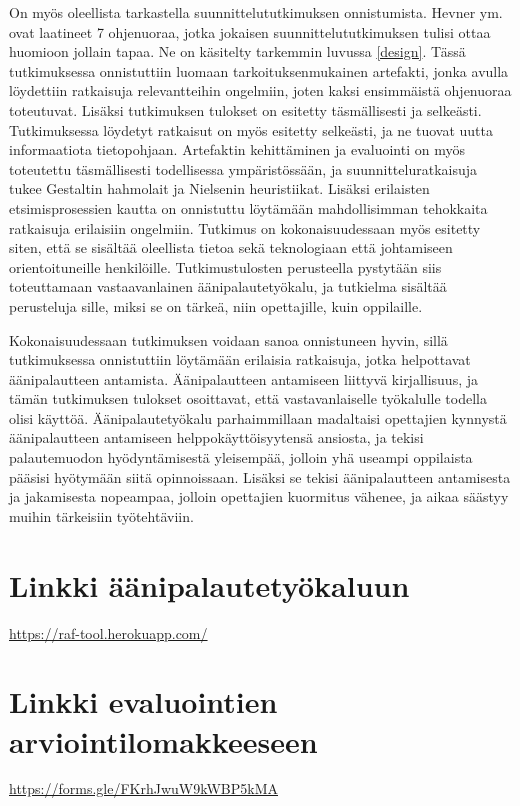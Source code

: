 \documentclass[utf8]{gradu3}
\begin{document}
On myös oleellista tarkastella suunnittelututkimuksen onnistumista. Hevner ym. \parencite*{hevner2004} ovat laatineet 7 ohjenuoraa, jotka jokaisen suunnittelututkimuksen tulisi ottaa huomioon jollain tapaa. Ne on käsitelty tarkemmin luvussa \ref{design}. Tässä tutkimuksessa onnistuttiin luomaan tarkoituksenmukainen artefakti, jonka avulla löydettiin ratkaisuja relevantteihin ongelmiin, joten kaksi ensimmäistä ohjenuoraa toteutuvat. Lisäksi tutkimuksen tulokset on esitetty täsmällisesti ja selkeästi. Tutkimuksessa löydetyt ratkaisut on myös esitetty selkeästi, ja ne tuovat uutta informaatiota tietopohjaan. Artefaktin kehittäminen ja evaluointi on myös toteutettu täsmällisesti todellisessa ympäristössään, ja suunnitteluratkaisuja tukee Gestaltin hahmolait ja Nielsenin heuristiikat. Lisäksi erilaisten etsimisprosessien kautta on onnistuttu löytämään mahdollisimman tehokkaita ratkaisuja erilaisiin ongelmiin. Tutkimus on kokonaisuudessaan myös esitetty siten, että se sisältää oleellista tietoa sekä teknologiaan että johtamiseen orientoituneille henkilöille. Tutkimustulosten perusteella pystytään siis toteuttamaan vastaavanlainen äänipalautetyökalu, ja tutkielma sisältää perusteluja sille, miksi se on tärkeä, niin opettajille, kuin oppilaille.

Kokonaisuudessaan tutkimuksen voidaan sanoa onnistuneen hyvin, sillä tutkimuksessa onnistuttiin löytämään erilaisia ratkaisuja, jotka helpottavat äänipalautteen antamista. Äänipalautteen antamiseen liittyvä kirjallisuus, ja tämän tutkimuksen tulokset osoittavat, että vastavanlaiselle työkalulle todella olisi käyttöä. Äänipalautetyökalu parhaimmillaan madaltaisi opettajien kynnystä äänipalautteen antamiseen helppokäyttöisyytensä ansiosta, ja tekisi palautemuodon hyödyntämisestä yleisempää, jolloin yhä useampi oppilaista pääsisi hyötymään siitä opinnoissaan. Lisäksi se tekisi äänipalautteen antamisesta ja jakamisesta nopeampaa, jolloin opettajien kuormitus vähenee, ja aikaa säästyy muihin tärkeisiin työtehtäviin.

%

\printbibliography

\appendix

\section{Linkki äänipalautetyökaluun}
\label{tool}

\url{https://raf-tool.herokuapp.com/}

\section{Linkki evaluointien arviointilomakkeeseen}
\label{lomake}

\url{https://forms.gle/FKrhJwuW9kWBP5kMA}
\end{document}
